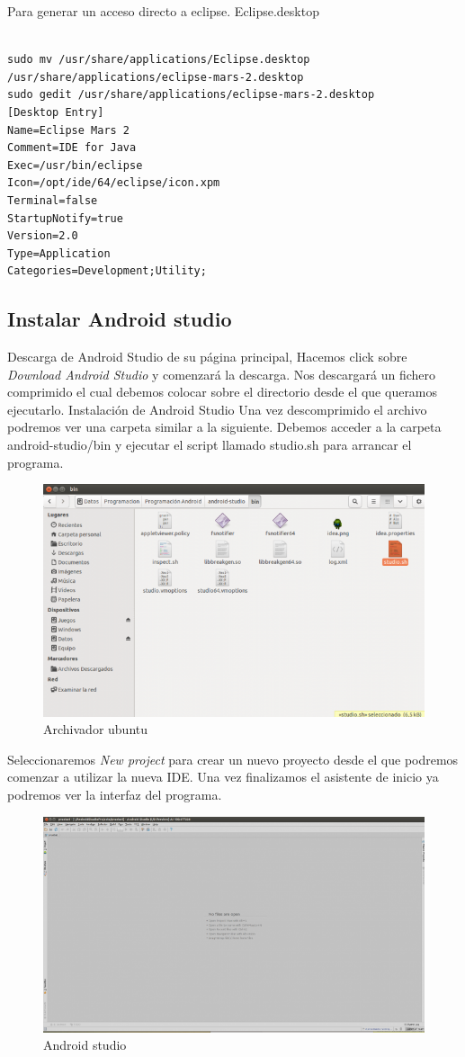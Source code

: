 Para generar un acceso directo a eclipse. Eclipse.desktop

\begin{lstlisting}

sudo mv /usr/share/applications/Eclipse.desktop /usr/share/applications/eclipse-mars-2.desktop
sudo gedit /usr/share/applications/eclipse-mars-2.desktop
[Desktop Entry]
Name=Eclipse Mars 2
Comment=IDE for Java
Exec=/usr/bin/eclipse
Icon=/opt/ide/64/eclipse/icon.xpm
Terminal=false
StartupNotify=true
Version=2.0
Type=Application
Categories=Development;Utility;
\end{lstlisting}

\subsection{Instalar Android studio}
Descarga de Android Studio de su página principal, Hacemos click sobre \textit{Download Android Studio} y comenzará la descarga. Nos descargará un fichero comprimido el cual debemos colocar sobre el directorio desde el que queramos ejecutarlo.
Instalación de Android Studio
Una vez descomprimido el archivo podremos ver una carpeta similar a la siguiente. Debemos acceder a la carpeta android-studio/bin y ejecutar el script llamado studio.sh para arrancar el programa.

\begin{figure}[H]
	\centering
	\includegraphics[width=0.6\linewidth]{figuras/and-1}
	\caption{Archivador ubuntu}
	\label{fig:and1}
\end{figure}


Seleccionaremos \textit{New project} para crear un nuevo proyecto desde el que podremos comenzar a utilizar la nueva IDE. Una vez finalizamos el asistente de inicio ya podremos ver la interfaz del programa.

\begin{figure}[H]
	\centering
	\includegraphics[width=0.7\linewidth]{figuras/and-2}
	\caption{Android studio}
	\label{fig:and2}
\end{figure}

